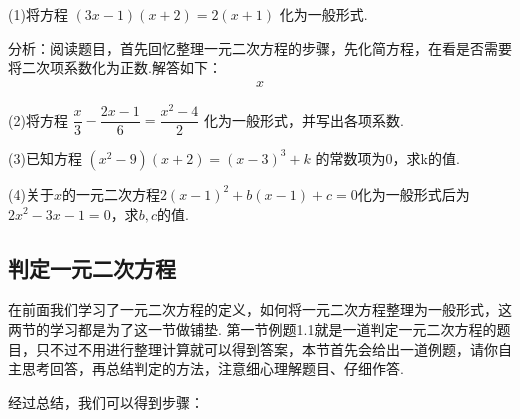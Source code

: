 \documentclass[lang=cn, 10pt, titlestyle=hang, oneside]{elegantbook}
\begin{document}
\begin{exercise}[解析]{}
    \setlength{\parindent}{0pt} %
    \setlength{\columnseprule}{0.01pt}
    \begin{multicols}{2}
        \begin{minipage}{1\linewidth}
        (1)将方程 $(3x-1)(x+2) = 2(x+1)$ 化为一般形式.
        \begin{solution}
    分析：阅读题目，首先回忆整理一元二次方程的步骤，先化简方程，在看是否需要将二次项系数化为正数.解答如下：
    \begin{align*}
    x%
    \end{align*}
\end{solution}
        \end{minipage}
        
        \begin{minipage}{1\linewidth}
        (2)将方程 $\dfrac{x}{3} - \dfrac{2x-1}{6} = \dfrac{x^2-4}{2}$ 化为一般形式，并写出各项系数.
        \end{minipage}

        \begin{minipage}{1\linewidth}
        (3)已知方程 $(x^2-9)(x+2) = (x-3)^3 + k$ 的常数项为0，求k的值.
        \end{minipage}

        \begin{minipage}{1\linewidth}
        (4)关于$x$的一元二次方程\(2(x-1)^2+b(x-1)+c=0\)化为一般形式后为\(2x^2-3x-1=0\)，求\(b,c\)的值.
        \end{minipage}
        
    \end{multicols}
\end{exercise}

\subsection{判定一元二次方程}
在前面我们学习了一元二次方程的定义，如何将一元二次方程整理为一般形式，这两节的学习都是为了这一节做铺垫. 第一节例题1.1就是一道判定一元二次方程的题目，只不过不用进行整理计算就可以得到答案，本节首先会给出一道例题，请你自主思考回答，再总结判定的方法，注意细心理解题目、仔细作答.



经过总结，我们可以得到步骤：
\end{document}
